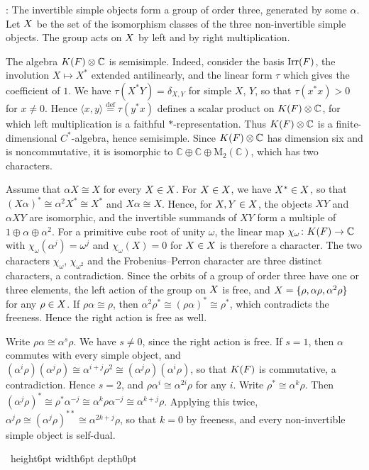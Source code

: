 \documentclass[leqno]{article}
\newcommand{\Cbb}{\ensuremath{\mathbb{C}}}
\newcommand{\M}{\mathrm{M}}
\let\cal\relax
\newcommand{\cal}{\mathcal}
\newcommand{\qed}{\hfill \vrule height6pt  width6pt depth0pt}
\newcommand{\co}{\colon}
\newcommand{\ot}{\otimes}
\newcommand{\ov}{\overset}
\DeclareMathOperator{\Irr}{Irr} %
\newenvironment{proof}[1][]{\noindent {\it Proof #1} : }{\hbox{~}\qed
\smallskip
}
\numberwithin{equation}{section}
\begin{document}
\begin{proof}
The invertible simple objects form a group of order three, generated by some $\alpha$. Let $\cal X$ be the set of the isomorphism classes of the three non-invertible simple objects. The group acts on $\cal X$ by left and by right multiplication.

The algebra $K(\cal F) \ot \Cbb$ is semisimple. Indeed, consider the basis $\Irr(\cal F)$, the involution $X \mapsto X^*$ extended antilinearly, and the linear form $\tau$ which gives the coefficient of $1$. We have $\tau(X^*Y) = \delta_{X,Y}$ for simple $X$, $Y$, so that $\tau(x^*x) > 0$ for $x \neq 0$. Hence $\langle x,y\rangle \ov{\mathrm{def}}{=} \tau(y^*x)$ defines a scalar product on $K(\cal F) \ot \Cbb$, for which left multiplication is a faithful $*$-representation. Thus $K(\cal F) \ot \Cbb$ is a finite-dimensional $C^*$-algebra, hence semisimple. Since $K(\cal F) \ot \Cbb$ has dimension six and is noncommutative, it is isomorphic to $\Cbb \oplus \Cbb \oplus \M_2(\Cbb)$, which has two characters.

Assume that $\alpha X \cong X$ for every $X \in \cal X$. For $X \in \cal X$, we have $X^* \in \cal X$, so that $(X\alpha)^* \cong \alpha^2 X^* \cong X^*$ and $X\alpha \cong X$. Hence, for $X, Y \in \cal X$, the objects $XY$ and $\alpha XY$ are isomorphic, and the invertible summands of $XY$ form a multiple of $1 \oplus \alpha \oplus \alpha^2$. For a primitive cube root of unity $\omega$, the linear map $\chi_\omega \co K(\cal F) \to \Cbb$ with $\chi_\omega(\alpha^j) = \omega^j$ and $\chi_\omega(X) = 0$ for $X \in \cal X$ is therefore a character. The two characters $\chi_\omega$, $\chi_{\omega^2}$ and the Frobenius--Perron character are three distinct characters, a contradiction. Since the orbits of a group of order three have one or three elements, the left action of the group on $\cal X$ is free, and $\cal X = \{\rho,\alpha\rho,\alpha^2\rho\}$ for any $\rho \in \cal X$. If $\rho\alpha \cong \rho$, then $\alpha^2\rho^* \cong (\rho\alpha)^* \cong \rho^*$, which contradicts the freeness. Hence the right action is free as well.

Write $\rho\alpha \cong \alpha^s\rho$. We have $s \neq 0$, since the right action is free. If $s = 1$, then $\alpha$ commutes with every simple object, and $(\alpha^i\rho)(\alpha^j\rho) \cong \alpha^{i+j}\rho^2 \cong (\alpha^j\rho)(\alpha^i\rho)$, so that $K(\cal F)$ is commutative, a contradiction. Hence $s = 2$, and $\rho\alpha^i \cong \alpha^{2i}\rho$ for any $i$. Write $\rho^* \cong \alpha^k\rho$. Then $(\alpha^j\rho)^* \cong \rho^*\alpha^{-j} \cong \alpha^k\rho\alpha^{-j} \cong \alpha^{k+j}\rho$. Applying this twice, $\alpha^j\rho \cong (\alpha^j\rho)^{**} \cong \alpha^{2k+j}\rho$, so that $k = 0$ by freeness, and every non-invertible simple object is self-dual.


\end{proof}
\end{document}
